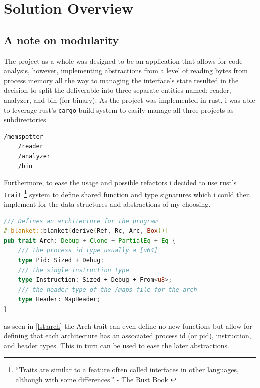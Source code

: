 \chapter{Solution Overview}
\label{cha:implementation}


\section{A note on modularity}

The project as a whole was designed to be an application that allows for code analysis, however, implementing abstractions from a level of reading bytes from process memory all the way to managing the interface's state resulted in the decision to split the deliverable into three separate entities named: reader, analyzer, and bin (for binary). As the project was implemented in rust, i was able to leverage rust's \verb|cargo| build system to easily manage all three projects as subdirectories

\begin{lstlisting}[caption="The basic project structure"]
/memspotter
    /reader
    /analyzer
    /bin
\end{lstlisting}

Furthermore, to ease the usage and possible refactors i decided to use rust's \verb|trait| \footnote{\enquote{Traits are similar to a feature often called interfaces in other languages, although with some differences.} - The Rust Book \cite{klabnik_traits_2023}} system to define shared function and type signatures which i could then implement for the data structures and abstractions of my choosing.

\begin{lstlisting}[caption=\label{lst:arch}"a trait definition example", language=Rust,]
/// Defines an architecture for the program
#[blanket::blanket(derive(Ref, Rc, Arc, Box))]
pub trait Arch: Debug + Clone + PartialEq + Eq {
    /// the process id type usually a [u64]
    type Pid: Sized + Debug;
    /// the single instruction type
    type Instruction: Sized + Debug + From<u8>;
    /// the header type of the /maps file for the arch
    type Header: MapHeader;
}    
\end{lstlisting}

as seen in \autoref{lst:arch} the Arch trait can even define no new functions but allow for defining that each architecture has an associated process id (or pid), instruction, and header types. This in turn can be used to ease the later abstractions. 

